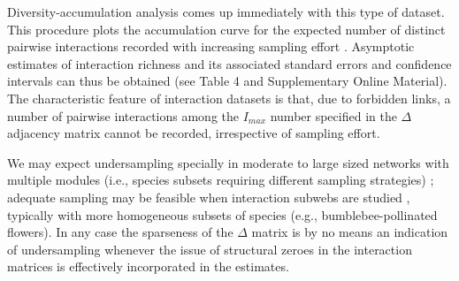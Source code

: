\documentclass[12pt]{article}
\begin{document}
Diversity-accumulation analysis \citep{Magurran:1988mm,Hortal:2006dc} comes up immediately with this type of dataset. This procedure plots the accumulation curve for the expected number of distinct pairwise interactions recorded with increasing sampling effort \citep{Jordano:2009c,Olesen:2011a}. Asymptotic estimates of interaction richness and its associated standard errors and confidence intervals can thus be obtained \citep{Hortal:2006dc} (see Table 4 and Supplementary Online Material). The characteristic feature of interaction datasets is that, due to forbidden links, a number of pairwise interactions among the $I_{max}$ number specified in the $\Delta$ adjacency matrix cannot be recorded, irrespective of sampling effort. 

We may expect undersampling specially in moderate to large sized networks with multiple modules (i.e., species subsets requiring different sampling strategies) \citep{E31/2562,Olesen:2011a,Chacoff:2012}; adequate sampling may be feasible when interaction subwebs are studied \citep{Olesen:2011a,Vizentin-Bugoni:2014hc}, typically with more homogeneous subsets of species (e.g., bumblebee-pollinated flowers). In any case the sparseness of the $\Delta$ matrix is by no means an indication of undersampling whenever the issue of structural zeroes in the interaction matrices is effectively incorporated in the estimates. 
\end{document}
